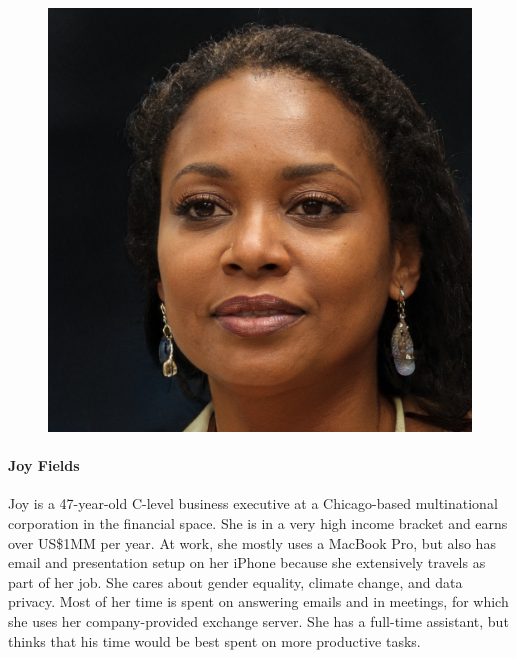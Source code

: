 \documentclass{article}
\begin{document}
\begin{figure}
	\includegraphics[scale=0.08]{persona-joy.jpg}
\end{figure}

\paragraph{Joy Fields}

Joy is a 47-year-old C-level business executive at a Chicago-based multinational corporation in the financial space. She is in a very high income bracket and earns over US\$1MM per year. At work, she mostly uses a MacBook Pro, but also has email and presentation setup on her iPhone because she extensively travels as part of her job. She cares about gender equality, climate change, and data privacy. Most of her time is spent on answering emails and in meetings, for which she uses her company-provided exchange server. She has a full-time assistant, but thinks that his time would be best spent on more productive tasks.
\end{document}
